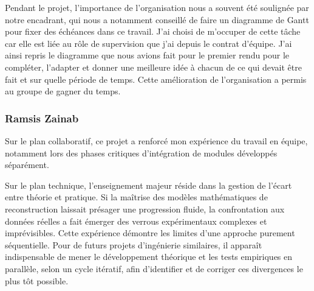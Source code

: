 \documentclass[10pt]{article} %
\begin{document}
Pendant le projet, l'importance de l'organisation nous a souvent été soulignée par notre encadrant, qui nous a notamment conseillé de faire un diagramme de Gantt pour fixer des échéances dans ce travail. J'ai choisi de m'occuper de cette tâche car elle est liée au rôle de supervision que j'ai depuis le contrat d'équipe. J'ai ainsi repris le diagramme que nous avions fait pour le premier rendu pour le compléter, l'adapter et donner une meilleure idée à chacun de ce qui devait être fait et sur quelle période de temps. Cette amélioration de l'organisation a permis au groupe de gagner du temps.

\subsubsection*{Ramsis Zainab}

Sur le plan collaboratif, ce projet a renforcé mon expérience du travail en équipe, notamment lors des phases critiques d'intégration de modules développés séparément.

Sur le plan technique, l'enseignement majeur réside dans la gestion de l'écart entre théorie et pratique. Si la maîtrise des modèles mathématiques de reconstruction laissait présager une progression fluide, la confrontation aux données réelles a fait émerger des verrous expérimentaux complexes et imprévisibles. Cette expérience démontre les limites d'une approche purement séquentielle. Pour de futurs projets d'ingénierie similaires, il apparaît indispensable de mener le développement théorique et les tests empiriques en parallèle, selon un cycle itératif, afin d'identifier et de corriger ces divergences le plus tôt possible.
\end{document}

